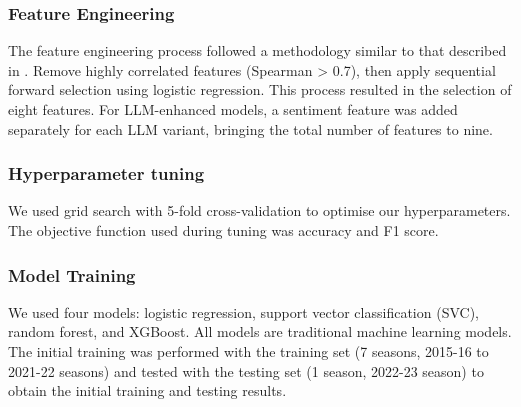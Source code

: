 \documentclass[conference]{IEEEtran}
\begin{document}
\subsubsection{Feature Engineering}
The feature engineering process followed a methodology similar to that described in \cite{walsh2024machine}. %
Remove highly correlated features (Spearman > 0.7), then apply sequential forward selection using logistic regression. 
This process resulted in the selection of eight features.
For LLM-enhanced models, a sentiment feature was added separately for each LLM variant, bringing the total number of features to nine.
\subsubsection{Hyperparameter tuning} We used grid search with 5-fold cross-validation to optimise our hyperparameters. The objective function used during tuning was accuracy and F1 score. 

\subsubsection{Model Training}


We used four models: logistic regression, support vector classification (SVC), random forest, and XGBoost. All models %
are traditional machine learning models. The initial training was performed with the training set (7 seasons, 2015-16 to 2021-22 seasons) and tested with the testing set (1 season, 2022-23 season) to obtain the initial training and testing results. 
\end{document}
